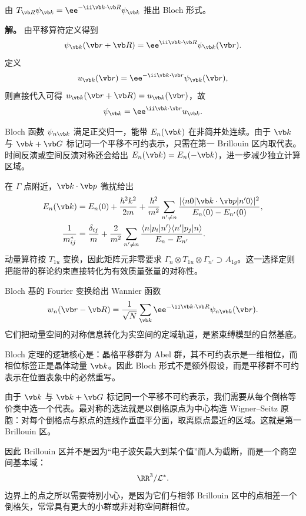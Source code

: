 \begin{workedexample}
由 $T_{\vb R}\psi_{\vb k}=\ee^{-\ii\vb k\cdot\vb R}\psi_{\vb k}$ 推出 Bloch 形式。

\textbf{解。} 由平移算符定义得到
\[
\psi_{\vb k}(\vb r+\vb R)=\ee^{\ii\vb k\cdot\vb R}\psi_{\vb k}(\vb r).
\]
定义
\[
u_{\vb k}(\vb r)=\ee^{-\ii\vb k\cdot\vb r}\psi_{\vb k}(\vb r),
\]
则直接代入可得 $u_{\vb k}(\vb r+\vb R)=u_{\vb k}(\vb r)$，故
\[
\psi_{\vb k}=\ee^{\ii\vb k\cdot\vb r}u_{\vb k}.
\]
\end{workedexample}


\par\medskip
\par\medskip

Bloch 函数 $\psi_{n\vb k}$ 满足正交归一，能带 $E_n(\vb k)$ 在非简并处连续。由于 $\vb k$ 与 $\vb k+\vb G$ 标记同一个平移不可约表示，只需在第一 Brillouin 区内取代表。时间反演或空间反演对称还会给出 $E_n(\vb k)=E_n(-\vb k)$，进一步减少独立计算区域。

在 $\Gamma$ 点附近，$\vb k\cdot\vb p$ 微扰给出
\begin{align*}
E_n(\vb k)
&=E_n(0)+\frac{\hbar^2k^2}{2m}
+\frac{\hbar^2}{m^2}\sum_{n'\ne n}
\frac{|\langle n0|\vb k\cdot\vb p|n'0\rangle|^2}{E_n(0)-E_{n'}(0)},\\
\frac{1}{m^*_{ij}}
&=\frac{\delta_{ij}}{m}+\frac{2}{m^2}\sum_{n'\ne n}
\frac{\langle n|p_i|n'\rangle\langle n'|p_j|n\rangle}{E_n-E_{n'}}.
\end{align*}
动量算符按 $T_{1u}$ 变换，因此矩阵元非零要求 $\Gamma_n\otimes T_{1u}\otimes\Gamma_{n'}\supset A_{1g}$。这一选择定则把能带的群论约束直接转化为有效质量张量的对称性。

Bloch 基的 Fourier 变换给出 Wannier 函数
\[
w_n(\vb r-\vb R)=\frac{1}{\sqrt N}\sum_{\vb k}
\ee^{-\ii\vb k\cdot\vb R}\psi_{n\vb k}(\vb r).
\]
它们把动量空间的对称信息转化为实空间的定域轨道，是紧束缚模型的自然基底。

Bloch 定理的逻辑核心是：晶格平移群为 Abel 群，其不可约表示是一维相位，而相位标签正是晶体动量 $\vb k$。因此 Bloch 形式不是额外假设，而是平移群不可约表示在位置表象中的必然重写。

由于 $\vb k$ 与 $\vb k+\vb G$ 标记同一个平移不可约表示，我们需要从每个倒格等价类中选一个代表。最对称的选法就是以倒格原点为中心构造 Wigner--Seitz 原胞：对每个倒格点与原点的连线作垂直平分面，取离原点最近的区域。这就是第一 Brillouin 区。

因此 Brillouin 区并不是因为“电子波矢最大到某个值”而人为截断，而是一个商空间基本域：
\[
\RR^3/\mathcal L^*.
\]
边界上的点之所以需要特别小心，是因为它们与相邻 Brillouin 区中的点相差一个倒格矢，常常具有更大的小群或非对称空间群相位。

